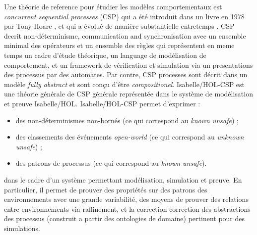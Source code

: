 \documentclass[a4paper,10pt]{article}
\begin{document}
Une théorie de reference pour étudier les modèles comportementaux est
\emph{concurrent sequential processes} (CSP) qui a été introduit dans un livre en 1978 
par Tony Hoare \cite{Hoare:1985:CSP:3921}, et qui a évolué de manière substantielle
entretemps \cite{BrookesHR84,brookes-roscoe85,roscoe:csp:1998}.
CSP decrit non-déterminisme, communication and synchronisation avec un ensemble
minimal des opérateurs et un ensemble des règles qui représentent en meme temps 
un cadre d'étude théorique, un language de modélisation de comportement, et un framework
de vérification et simulation via un presentations des processus par des automates. 
Par contre, CSP processes sont décrit dans un modèle \emph{fully abstract} et sont conçu d'être \emph{compositionel}. 
Isabelle/HOL-CSP\cite{HOL-CSP-AFP} est une théorie générale de CSP générale
représentée dans le système de modélisation et preuve Isabelle/HOL\cite{nipkow.ea:isabelle:2002}. 
Isabelle/HOL-CSP permet d'exprimer :
\begin{itemize}
\item
  des non-déterminismes non-bornés
  (ce qui correspond au \emph{known unsafe}) ; 
\item
  des classements des événements \emph{open-world}
  (ce qui correspond au \emph{unknown unsafe}) ;
\item
  des patrons de processus (ce qui correspond au \emph{known unsafe}).
\end{itemize}
dans le cadre d'un système  permettant
modélisation, simulation et preuve.
En particulier, il permet de prouver des propriétés sur des patrons des environnements
avec une grande variabilité, des moyens de prouver des relations entre environnements
via raffinement, et la correction correction des abstractions des processus (construit a partir des 
ontologies de domaine)  pertinent pour des simulations.

\end{document}
